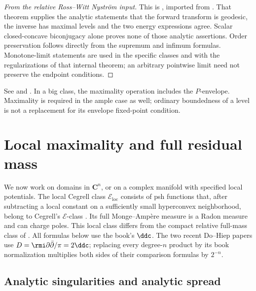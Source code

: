 \begin{proof}[From the relative Ross--Witt Nystr\"om input]
This is , imported from
\cite[Theorem~9.2.1, equations~(9.19)--(9.21)]{XiaBook}.
That theorem supplies the analytic statements that the forward transform
is geodesic, the inverse has maximal levels and the two energy expressions
agree.  Scalar closed-concave biconjugacy alone proves none of those
analytic assertions.  Order preservation follows directly from the
supremum and infimum formulas.  Monotone-limit statements are used in the
specific classes and with the regularizations of that internal theorem;
an arbitrary pointwise limit need not preserve the endpoint conditions.
\end{proof}

See \cite{RWN14} and . In a big class,
the maximality operation includes the \(P\)-envelope.  Maximality is
required in the ample case as well; ordinary boundedness of a level is
not a replacement for its envelope fixed-point condition.

\section{Local maximality and full residual mass}
\label{sec:appH-local-maximality}

We now work on domains in \(\mathbf C^n\), or on a complex manifold
with specified local potentials. The local Cegrell class
\(\mathcal E_{\mathrm{loc}}\) consists of psh functions that, after
subtracting a local constant on a sufficiently small hyperconvex
neighborhood, belong to Cegrell's \(\mathcal E\)-class
\cite{Ceg04}. Its full Monge--Amp\`ere measure is a Radon measure
and can charge poles. This local class differs from the compact
relative full-mass class of .
All formulas below use the book's \(\ddc\). The two recent
Do--Hiep papers use \(D=\rmi\partial\bar\partial/\pi=2\ddc\);
replacing every degree-\(n\) product by its book normalization
multiplies both sides of their comparison formulas by \(2^{-n}\).

\subsection{Analytic singularities and analytic spread}
\label{sec:appH-analytic-spread-maximality}

